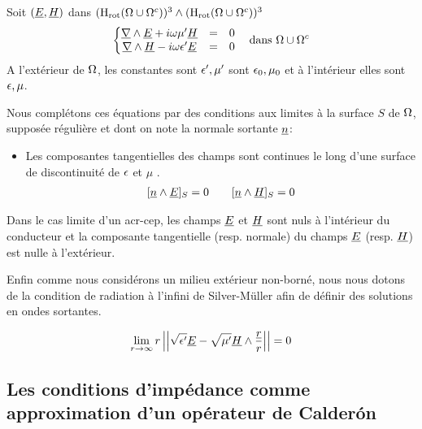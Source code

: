 Soit $(\underline{E},\underline{H})$ dans $(\operatorname{H_{rot}}(\Omega\cup\Omega^c))^3 \wedge (\operatorname{H_{rot}}(\Omega\cup\Omega^c))^3$
\begin{equation}
  \label{eq:pres_th:intro:maxwell}
  \left\lbrace \begin{matrix}
  \underline{\nabla} \wedge \underline{E} + i\omega\mu' \underline{H} &=& 0 \\
  \underline{\nabla} \wedge \underline{H} - i\omega\epsilon' \underline{E} &=& 0 \\
  \end{matrix} \right. \quad \text{dans $\Omega\cup\Omega^c$}
\end{equation}
A l'extérieur de $\Omega$, les constantes sont $\epsilon',\mu'$ sont $\epsilon_0,\mu_0$ et à l'intérieur elles sont $\epsilon,\mu$.

Nous complétons ces équations par des conditions aux limites à la surface $S$ de $\Omega$, supposée régulière et dont on note la normale sortante $\underline{n}$:
\begin{itemize}
  \item Les composantes tangentielles des champs sont continues le long d'une surface de discontinuité de $\epsilon$ et $\mu$ \cite[(2.10) p.~8]{senior_approximate_1995}.
\begin{align}
  \label{eq:pres_th:intro:transmissions}[\underline{n} \wedge \underline{E}]_S = 0  \qquad [\underline{n} \wedge \underline{H}]_S = 0
\end{align}
\end{itemize}
Dans le cas limite d'un \gls{acr-cep}, les champs $\underline{E}$ et $\underline{H}$ sont nuls à l'intérieur du conducteur et la composante tangentielle (resp. normale) du champs $\underline{E}$ (resp. $\underline{H}$) est nulle à l'extérieur.

Enfin comme nous considérons un milieu extérieur non-borné, nous nous dotons de la condition de radiation à l'infini de Silver-Müller afin de définir des solutions en ondes sortantes.

\begin{equation}
  \label{eq:pres_th:intro:silver-muller}
  \lim_{r\rightarrow\infty}r\left|\left|\sqrt{\epsilon'}\underline{E} - \sqrt{\mu'}\underline{H}\wedge\dfrac{\underline{r}}{r}\right|\right| = 0
\end{equation} 

\subsection{Les conditions d'impédance comme approximation d'un opérateur de Calderón}

